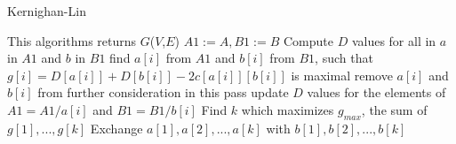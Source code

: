 \begin{algorithm}
\caption{Kernighan-Lin}
\label{kernighan-lin}
\begin{algorithmic}

    \State This algorithms returns $G$($V$,$E$)
        \State $A1 :=A, B1 :=B$
        \State Compute $D$ values for all in $a$ in $A1$ and $b$ in $B1$
            \State find $a[i]$ from $A1$ and $b[i]$ from $B1$, such that
                \State $g[i] = D[a[i]] + D[b[i]] -2c[a[i]][b[i]]$ is maximal
            \State remove $a[i]$ and $b[i]$ from further consideration in this pass
            \State update $D$ values for the elements of $A1 = A1 / a[i]$ and $B1 = B1 / b[i]$
        \EndFor
        \State Find $k$ which maximizes $g_{max}$, the sum of $g[1],...,g[k]$
         {Exchange $a[1],a[2],...,a[k]$ with $b[1],b[2],...,b[k]$}\EndWhile
\end{algorithmic}
\end{algorithm}
